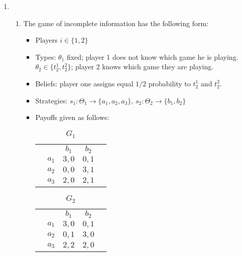 \documentclass[11pt]{article}
\begin{document}
\begin{enumerate}
	\item 
	\begin{enumerate}
		\item The game of incomplete information has the following form:
		\begin{itemize}
			\item Players $ i\in\{1,2\} $
			\item Types: $ \theta_1 $ fixed; player 1 does not know which game he is playing. $ \theta_2 \in\{t_2^1, t_2^2\}$; player 2 knows which game they are playing. 
			\item Beliefs: player one assigns equal $ 1/2 $ probability to $ t_2^1 $ and $ t_2^2 $. 
			\item Strategies: $ s_1: \Theta_1 \to \{a_1, a_2, a_3\} $, $ s_2: \Theta_2\to\{b_1, b_2\} $
			\item Payoffs given as follows: \newpage
			\begin{table}[!htbp]
				\centering
				\caption{$ G_1 $}
				\setlength{\extrarowheight}{2pt}
				\begin{tabular}{cc|c|c|c|}
					& \multicolumn{1}{c}{} & \multicolumn{1}{c}{$b_1$}  & \multicolumn{1}{c}{$b_2$}  \\\cline{3-4} 
					& $a_1$ & $ 3,0 $ & $ 0,1 $ \\\cline{3-4}
					& $a_2$ & $ 0,0 $ & $ 3,1 $ \\\cline{3-4}
					& $a_3$ & $ 2,0 $ & $ 2,1 $ \\\cline{3-4}
				\end{tabular}
			\end{table}
		
			\begin{table}[!htbp]
				\centering
				\caption{$ G_2 $}
				\setlength{\extrarowheight}{2pt}
				\begin{tabular}{cc|c|c|c|}
					& \multicolumn{1}{c}{} & \multicolumn{1}{c}{$b_1$}  & \multicolumn{1}{c}{$b_2$}  \\\cline{3-4} 
					& $a_1$ & $ 3,0 $ & $ 0,1 $ \\\cline{3-4}
					& $a_2$ & $ 0,1 $ & $ 3,0 $ \\\cline{3-4}
					& $a_3$ & $ 2,2 $ & $ 2,0 $ \\\cline{3-4}
				\end{tabular}
			\end{table}
		\end{itemize}
		

\end{enumerate}
\end{enumerate}
\end{document}
